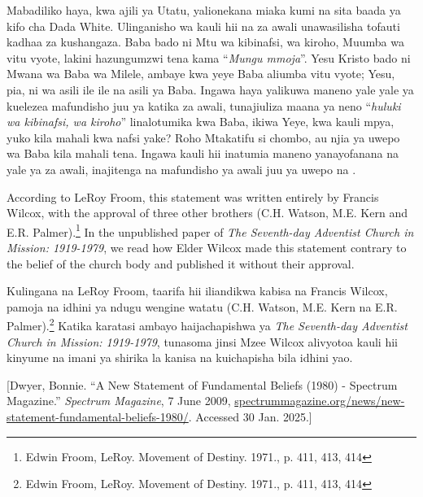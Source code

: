 Mabadiliko haya, kwa ajili ya Utatu, yalionekana miaka kumi na sita baada ya kifo cha Dada White. Ulinganisho wa kauli hii na  za awali unawasilisha tofauti kadhaa za kushangaza. Baba bado ni Mtu wa kibinafsi, wa kiroho, Muumba wa vitu vyote, lakini hazungumzwi tena kama “\textit{Mungu mmoja}”. Yesu Kristo bado ni Mwana wa Baba wa Milele, ambaye kwa yeye Baba aliumba vitu vyote; Yesu, pia, ni wa asili ile ile na asili ya Baba. Ingawa haya yalikuwa maneno yale yale ya kuelezea mafundisho juu ya  katika  za awali, tunajiuliza maana ya neno “\textit{huluki wa kibinafsi, wa kiroho}” linalotumika kwa Baba, ikiwa Yeye, kwa kauli mpya, yuko kila mahali kwa nafsi yake? Roho Mtakatifu si chombo, au njia ya uwepo wa Baba kila mahali tena. Ingawa kauli hii inatumia maneno yanayofanana na yale ya  za awali, inajitenga na mafundisho ya awali juu ya uwepo na .


According to LeRoy Froom, this statement was written entirely by Francis Wilcox, with the approval of three other brothers (C.H. Watson, M.E. Kern and E.R. Palmer).\footnote{Edwin Froom, LeRoy. Movement of Destiny. 1971., p. 411, 413, 414} In the unpublished paper of \textit{The Seventh-day Adventist Church in Mission: 1919-1979}, we read how Elder Wilcox made this statement contrary to the belief of the church body and published it without their approval.


Kulingana na LeRoy Froom, taarifa hii iliandikwa kabisa na Francis Wilcox, pamoja na idhini ya ndugu wengine watatu (C.H. Watson, M.E. Kern na E.R. Palmer).\footnote{Edwin Froom, LeRoy. Movement of Destiny. 1971., p. 411, 413, 414} Katika karatasi ambayo haijachapishwa ya \textit{The Seventh-day Adventist Church in Mission: 1919-1979}, tunasoma jinsi Mzee Wilcox alivyotoa kauli hii kinyume na imani ya shirika la kanisa na kuichapisha bila idhini yao.


[Dwyer, Bonnie. “A New Statement of Fundamental Beliefs (1980) - Spectrum Magazine.” \textit{Spectrum Magazine}, 7 June 2009, \href{https://spectrummagazine.org/news/new-statement-fundamental-beliefs-1980/}{spectrummagazine.org/news/new-statement-fundamental-beliefs-1980/}. Accessed 30 Jan. 2025.]


